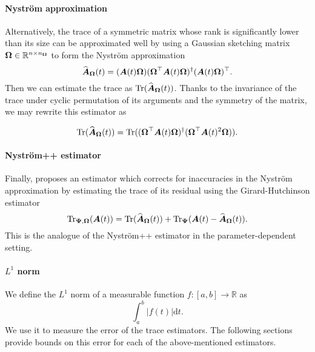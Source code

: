 \documentclass[12pt]{article}
\begin{document}
\paragraph{Nyström approximation} Alternatively, the trace of a symmetric matrix whose rank is significantly lower than its size can be approximated well by using a Gaussian sketching matrix $\boldsymbol{\Omega} \in \mathbb{R}^{n \times n_{\boldsymbol{\Omega}}}$ to form the Nyström approximation \cite{gittens-2013-revisiting-nystrom}
\begin{equation}
    \widehat{\boldsymbol{A}}_{\boldsymbol{\Omega}}(t) = (\boldsymbol{A}(t) \boldsymbol{\Omega}) (\boldsymbol{\Omega}^{\top} \boldsymbol{A}(t) \boldsymbol{\Omega})^{\dagger} (\boldsymbol{A}(t) \boldsymbol{\Omega})^{\top}.
    \label{equ:nystrom-approximation}
\end{equation}
Then we can estimate the trace as $\operatorname{Tr}(\widehat{\boldsymbol{A}}_{\boldsymbol{\Omega}}(t))$. Thanks to the invariance of the trace under cyclic permutation of its arguments and the symmetry of the matrix, we may rewrite this estimator as

\begin{equation}
    \operatorname{Tr}(\widehat{\boldsymbol{A}}_{\boldsymbol{\Omega}}(t)) = \operatorname{Tr}( (\boldsymbol{\Omega}^{\top} \boldsymbol{A}(t) \boldsymbol{\Omega})^{\dagger} ( \boldsymbol{\Omega}^{\top} \boldsymbol{A}(t)^2 \boldsymbol{\Omega})).
    \label{equ:nystrom-trace-estimator}
\end{equation}

\paragraph{Nyström++ estimator} Finally, \cite{lin-2017-randomized-estimation} proposes an estimator which corrects for inaccuracies in the Nyström approximation  by estimating the trace of its residual using the Girard-Hutchinson estimator 
\begin{equation}
    \operatorname{Tr}_{\boldsymbol{\Psi}, \boldsymbol{\Omega}}(\boldsymbol{A}(t)) = \operatorname{Tr}(\widehat{\boldsymbol{A}}_{\boldsymbol{\Omega}}(t)) + \operatorname{Tr}_{\boldsymbol{\Psi}}(\boldsymbol{A}(t) - \widehat{\boldsymbol{A}}_{\boldsymbol{\Omega}}(t)).
    \label{equ:nystrompp-trace-estimator}
\end{equation}
This is the analogue of the Nyström++ estimator \cite{persson-2022-improved-variants} in the parameter-dependent setting. %

\paragraph{$L^{1}$ norm}
We define the $L^{1}$ norm of a measurable function $f:[a,b] \to \mathbb{R}$ as
\begin{equation}
    \int_{a}^{b} | f(t) | \mathrm{d}t.
\end{equation}
We use it to measure the error of the trace estimators. The following sections provide bounds on this error for each of the above-mentioned estimators.
\end{document}
